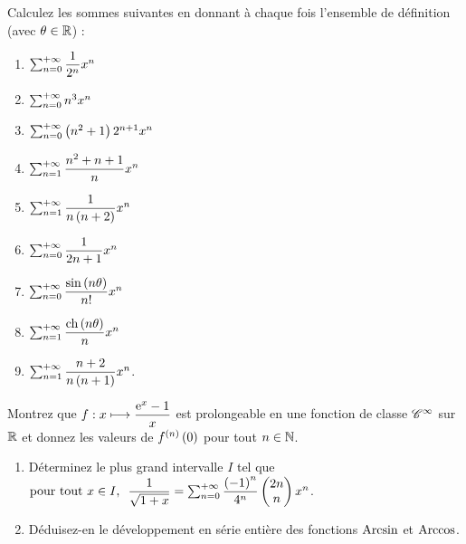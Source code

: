 \begin{exoss}
Calculez les sommes suivantes en donnant à chaque fois l'ensemble de définition (avec \(\theta\in\mathbb{R}\)) :

\begin{enumerate}
    \item \(\sum_{n=0}^{+\infty}\dfrac{1}{2^n}x^n\) \\
    \item \(\sum_{n=0}^{+\infty}n^3x^n\) \\
    \item \(\sum_{n=0}^{+\infty}\left(n^2+1\right)2^{n+1}x^n\) \\
    \item \(\sum_{n=1}^{+\infty}\dfrac{n^2+n+1}{n}x^n\) \\
    \item \(\sum_{n=1}^{+\infty}\dfrac{1}{n\left(n+2\right)}x^n\) \\
    \item \(\sum_{n=0}^{+\infty}\dfrac{1}{2n+1}x^n\) \\
    \item \(\sum_{n=0}^{+\infty}\dfrac{\sin\left(n\theta\right)}{n!}x^n\) \\
    \item \(\sum_{n=1}^{+\infty}\dfrac{\operatorname{ch}\left(n\theta\right)}{n}x^n\) \\
    \item \(\sum_{n=1}^{+\infty}\dfrac{n+2}{n\left(n+1\right)}x^n\).
\end{enumerate}
\end{exoss}

\begin{exos}
Montrez que \(f:x\longmapsto\dfrac{\mathrm{e}^{x}-1}{x}\) est prolongeable en une fonction de classe \(\mathscr{C}^{\infty}\) sur \(\mathbb{R}\) et donnez les valeurs de \(f^{\left(n\right)}\left(0\right)\) pour tout \(n\in\mathbb{N}\).
\end{exos}

\begin{exoss}
\begin{enumerate}
    \item Déterminez le plus grand intervalle \(I\) tel que \(\quantifs{\tpt x\in I}\dfrac{1}{\sqrt{1+x}}=\sum_{n=0}^{\pinf}\dfrac{\paren{-1}^n}{4^n}\binom{n}{2n}x^n\). \\
    \item Déduisez-en le développement en série entière des fonctions \(\operatorname{Arcsin}\) et \(\operatorname{Arccos}\).
\end{enumerate}
\end{exoss}

